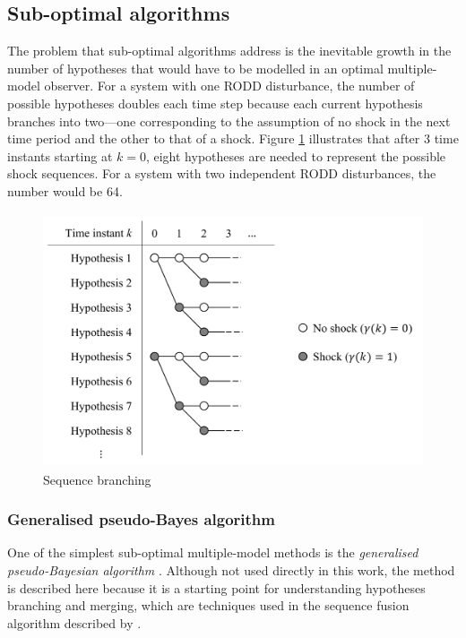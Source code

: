 {\subsection{Sub-optimal algorithms} \label{sec:sub-opt}

The problem that sub-optimal algorithms address is the inevitable growth in the number of hypotheses that would have to be modelled in an optimal multiple-model observer. For a system with one \gls{RODD} disturbance, the number of possible hypotheses doubles each time step because each current hypothesis branches into two—one corresponding to the assumption of no shock in the next time period and the other to that of a shock. Figure \ref{fig:mm-obs-br} illustrates that after 3 time instants starting at $k=0$, eight hypotheses are needed to represent the possible shock sequences. For a system with two independent \gls{RODD} disturbances, the number would be 64.

\begin{figure}[ht]
	\centering
	\includegraphics[height=7.5cm]{images/mm_obs_seq_br.pdf}
	\caption{Sequence branching}
	\label{fig:mm-obs-br}
\end{figure}

\subsubsection{Generalised pseudo-Bayes algorithm} \label{sec:GPB}

One of the simplest sub-optimal multiple-model methods is the \textit{generalised pseudo-Bayesian algorithm} \citep{buxbaum_recursive_1969, jaffer_estimation_1971, tugnait_detection_1982}. Although not used directly in this work, the method is described here because it is a starting point for understanding hypotheses branching and merging, which are techniques used in the sequence fusion algorithm described by \cite{robertson_detection_1995}.

}
